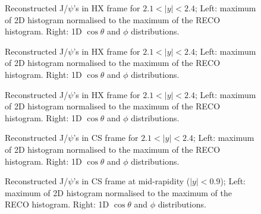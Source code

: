 \documentclass[12pt]{article}
\newcommand{\jpsi}{J/$\psi$}
\begin{document}
\begin{figure}[htbp]
\centering
{}
\caption{Reconstructed \jpsi's in HX frame for $2.1 < |y| < 2.4$; Left: maximum of 2D histogram normalised to the maximum of the RECO histogram. Right: 1D $\cos\theta$ and $\phi$ distributions.}
\label{fig:trackerMuonsVsEta}
\end{figure} \clearpage 

\begin{figure}[htbp]
\centering
{}
\caption{Reconstructed \jpsi's in HX frame for $2.1 < |y| < 2.4$; Left: maximum of 2D histogram normalised to the maximum of the RECO histogram. Right: 1D $\cos\theta$ and $\phi$ distributions.}
\label{fig:trackerMuonsVsEta}
\end{figure} \clearpage 

\begin{figure}[htbp]
\centering
{}
\caption{Reconstructed \jpsi's in HX frame for $2.1 < |y| < 2.4$; Left: maximum of 2D histogram normalised to the maximum of the RECO histogram. Right: 1D $\cos\theta$ and $\phi$ distributions.}
\label{fig:trackerMuonsVsEta}
\end{figure} \clearpage 


\begin{figure}[htbp]
\centering
{}
\caption{Reconstructed \jpsi's in CS frame for $2.1 < |y| < 2.4$; Left: maximum of 2D histogram normalised to the maximum of the RECO histogram. Right: 1D $\cos\theta$ and $\phi$ distributions.}
\label{fig:trackerMuonsVsEta}
\end{figure} \clearpage 


\begin{figure}[htbp]
\centering
{}
\caption{Reconstructed \jpsi's in CS frame at mid-rapidity ($|y| < 0.9$); Left: maximum of 2D histogram normalised to the maximum of the RECO histogram. Right: 1D $\cos\theta$ and $\phi$ distributions.}
\label{fig:trackerMuonsVsEta}
\end{figure} \clearpage 
\end{document}
